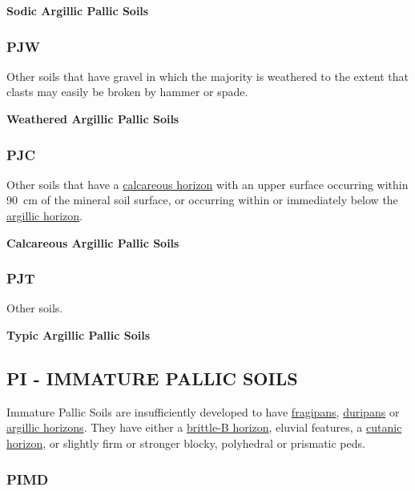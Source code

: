 \documentclass[
  letterpaper,
  DIV=11,
  numbers=noendperiod]{scrreprt}
\begin{document}
\textbf{Sodic Argillic Pallic Soils}

\hypertarget{sec-key-PJW}{%
\subsubsection{\texorpdfstring{\textbf{PJW}}{PJW}}\label{sec-key-PJW}}

Other soils that have gravel in which the majority is weathered to the
extent that clasts may easily be broken by hammer or spade.

\textbf{Weathered Argillic Pallic Soils}

\hypertarget{sec-key-PJC}{%
\subsubsection{\texorpdfstring{\textbf{PJC}}{PJC}}\label{sec-key-PJC}}

Other soils that have a \protect\hyperlink{sec-diag-calch}{calcareous
horizon} with an upper surface occurring within 90~cm of the mineral
soil surface, or occurring within or immediately below the
\protect\hyperlink{sec-diag-argh}{argillic horizon}.

\textbf{Calcareous Argillic Pallic Soils}

\hypertarget{sec-key-PJT}{%
\subsubsection{\texorpdfstring{\textbf{PJT}}{PJT}}\label{sec-key-PJT}}

Other soils.

\textbf{Typic Argillic Pallic Soils}

\hypertarget{sec-PI}{%
\subsection{\texorpdfstring{\textbf{PI} - IMMATURE PALLIC
SOILS}{PI - IMMATURE PALLIC SOILS}}\label{sec-PI}}

Immature Pallic Soils are insufficiently developed to have
\protect\hyperlink{sec-diag-fpan}{fragipans},
\protect\hyperlink{sec-diag-dpan}{duripans} or
\protect\hyperlink{sec-diag-argh}{argillic horizons}. They have either a
\protect\hyperlink{sec-diag-britb}{brittle-B horizon}, eluvial features,
a \protect\hyperlink{sec-diag-cuth}{cutanic horizon}, or slightly firm
or stronger blocky, polyhedral or prismatic peds.

\hypertarget{sec-key-PIMD}{%
\subsubsection{\texorpdfstring{\textbf{PIMD}}{PIMD}}\label{sec-key-PIMD}}
\end{document}

